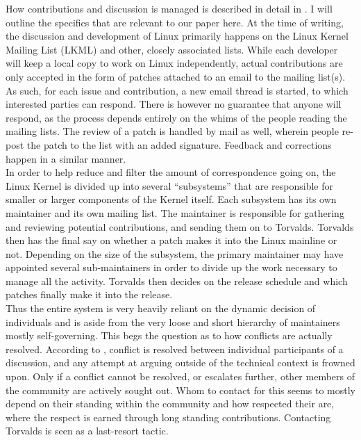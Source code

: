 How contributions and discussion is managed is described in detail in \cite{linux-participation}. I will outline the specifics that are relevant to our paper here. At the time of writing, the discussion and development of Linux primarily happens on the Linux Kernel Mailing List (LKML) and other, closely associated lists. While each developer will keep a local copy to work on Linux independently, actual contributions are only accepted in the form of patches attached to an email to the mailing list(s). As such, for each issue and contribution, a new email thread is started, to which interested parties can respond. There is however no guarantee that anyone will respond, as the process depends entirely on the whims of the people reading the mailing lists. The review of a patch is handled by mail as well, wherein people re-post the patch to the list with an added signature. Feedback and corrections happen in a similar manner. \\

In order to help reduce and filter the amount of correspondence going on, the Linux Kernel is divided up into several ``subsystems'' that are responsible for smaller or larger components of the Kernel itself. Each subsystem has its own maintainer and its own mailing list. The maintainer is responsible for gathering and reviewing potential contributions, and sending them on to Torvalds. Torvalds then has the final say on whether a patch makes it into the Linux mainline or not. Depending on the size of the subsystem, the primary maintainer may have appointed several sub-maintainers in order to divide up the work necessary to manage all the activity. Torvalds then decides on the release schedule and which patches finally make it into the release. \\

Thus the entire system is very heavily reliant on the dynamic decision of individuals and is aside from the very loose and short hierarchy of maintainers mostly self-governing. This begs the question as to how conflicts are actually resolved. According to \citet{linux-participation}, conflict is resolved between individual participants of a discussion, and any attempt at arguing outside of the technical context is frowned upon. Only if a conflict cannot be resolved, or escalates further, other members of the community are actively sought out. Whom to contact for this seems to mostly depend on their standing within the community and how respected their are, where the respect is earned through long standing contributions. Contacting Torvalds is seen as a last-resort tactic. \\


